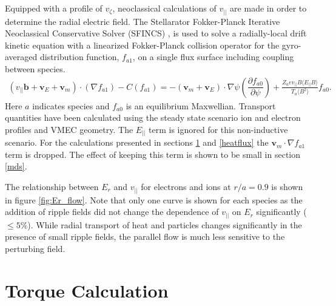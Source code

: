 \documentclass{article}
\newcommand{\partder}[2]{\dfrac{\partial  #1}{\partial  #2}} %
\begin{document}
Equipped with a profile of $v_{\zeta}$, neoclassical calculations of $v_{||}$ are made in order to determine the radial electric field. The Stellarator Fokker-Planck Iterative Neoclassical Conservative Solver (SFINCS) \cite{Landreman2014}, is used to solve a radially-local drift kinetic equation with a linearized Fokker-Planck collision operator for the gyro-averaged distribution function, $f_{a1}$, on a single flux surface including coupling between species. 
\begin{gather}
( v_{||} \bm{b} + \bm{v}_E + \bm{v}_m) \cdot (\nabla f_{a1})  - C(f_{a1}) = - (\bm{v}_{m} + \bm{v}_E) \cdot \nabla \psi \left( \partder{f_{a0}}{\psi} \right) + \frac{Z_a e v_{||} B \langle E_{||} B \rangle}{T_a \langle B^2 \rangle } f_{a0}.
\end{gather} \label{kineticequation}
\hspace{-1mm}Here $a$ indicates species and $f_{a0}$ is an equilibrium Maxwellian. Transport quantities have been calculated using the steady state scenario ion and electron profiles and VMEC geometry. The $E_{||}$ term is ignored for this non-inductive scenario. For the calculations presented in sections \ref{torque} and \ref{heatflux} the $\bm{v}_m \cdot \nabla f_{a1}$ term is dropped. The effect of keeping this term is shown to be small in section \ref{mds}.

The relationship between $E_r$ and $v_{||}$ for electrons and ions at $r/a = 0.9$ is shown in figure \ref{fig:Er_flow}. Note that only one curve is shown for each species as the addition of ripple fields did not change the dependence of $v_{||}$ on $E_r$ significantly ($\leq 5 \%$). While radial transport of heat and particles changes significantly in the presence of small ripple fields, the parallel flow is much less sensitive to the perturbing field. 

\FloatBarrier

\section{Torque Calculation}\label{torque}
\end{document}

